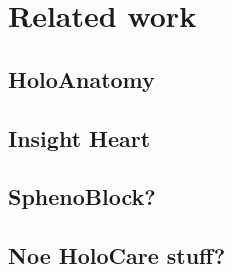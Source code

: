 \section{Related work}

\subsection*{HoloAnatomy}

\subsection*{Insight Heart}

\subsection*{SphenoBlock?}

\subsection*{Noe HoloCare stuff?}

